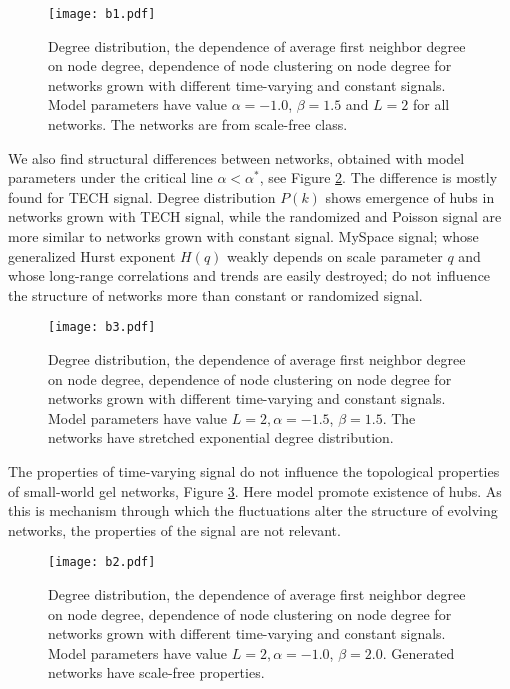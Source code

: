 \begin{figure}[h!]
	\centering
	\texttt{[image: b1.pdf]}
	\caption{Degree distribution, the dependence of average first neighbor degree on node degree, dependence of node clustering on node degree for networks grown with different time-varying and constant signals. Model parameters have value $\alpha=-1.0$, $\beta=1.5$  and $L=2$ for all networks. The networks are from scale-free class.}
	\label{fig:properties_sf}
\end{figure}

We also find structural differences between networks, obtained with model parameters under the critical line $\alpha<\alpha^{*}$, see Figure \ref{fig:properties_se}. The difference is mostly found for TECH signal. Degree distribution $P(k)$ shows emergence of hubs in networks grown with TECH signal, while the randomized and Poisson signal are more similar to networks grown with constant signal. MySpace signal; whose generalized Hurst exponent $H(q)$ weakly depends on scale parameter $q$ and whose long-range correlations and trends are easily destroyed; do not influence the structure of networks more than constant or randomized signal.   

\begin{figure}[h!]
	\centering
	\texttt{[image: b3.pdf]}
	\caption{Degree distribution, the dependence of average first neighbor degree on node degree, dependence of node clustering on node degree for networks grown with different time-varying and constant signals. Model parameters have value $L=2, \alpha=-1.5$, $\beta=1.5$. The networks have stretched exponential degree distribution.}
	\label{fig:properties_se}
\end{figure}

The properties of time-varying signal do not influence the topological properties of small-world gel networks, Figure \ref{fig:properties_sw}. Here model promote existence of hubs. As this is mechanism through which the fluctuations alter the structure of evolving networks, the properties of the signal are not relevant.  


\begin{figure}[h!]
	\centering
	\texttt{[image: b2.pdf]}
	\caption{Degree distribution, the dependence of average first neighbor degree on node degree, dependence of node clustering on node degree for networks grown with different time-varying and constant signals. Model parameters have value $ L=2, \alpha=-1.0$, $\beta=2.0$. Generated networks have scale-free properties.}
	\label{fig:properties_sw}
\end{figure} 


